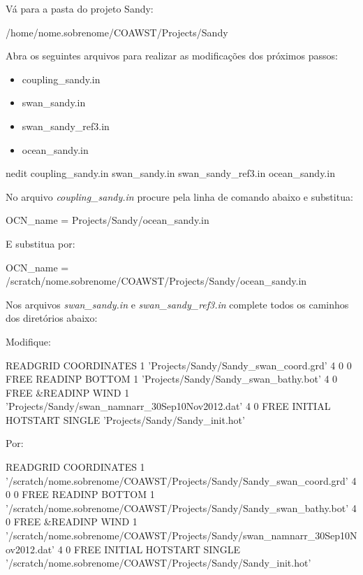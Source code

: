 \noindent Vá para a pasta do projeto Sandy:
\bigskip

\begin{bashcode}
/home/nome.sobrenome/COAWST/Projects/Sandy
\end{bashcode}
\bigskip

\noindent Abra os seguintes arquivos para realizar as modificações dos próximos passos:
\bigskip

\begin{itemize}
\item coupling\_sandy.in
\item swan\_sandy.in
\item swan\_sandy\_ref3.in
\item ocean\_sandy.in
\end{itemize}
\bigskip

\begin{bashcode}
nedit coupling_sandy.in swan_sandy.in swan_sandy_ref3.in ocean_sandy.in
\end{bashcode}
\bigskip

\noindent No arquivo \textit{coupling\_sandy.in} procure pela linha de comando abaixo e substitua:
\bigskip

\begin{bashcode}
OCN_name = Projects/Sandy/ocean_sandy.in
\end{bashcode}
\bigskip

\noindent E substitua por:
\bigskip

\begin{bashcode}
OCN_name = /scratch/nome.sobrenome/COAWST/Projects/Sandy/ocean_sandy.in
\end{bashcode}
\bigskip

\noindent Nos arquivos \textit{swan\_sandy.in} e \textit{swan\_sandy\_ref3.in} complete todos os caminhos dos diretórios abaixo:
\bigskip

\noindent Modifique:
\bigskip

\begin{bashcode}
READGRID COORDINATES 1 'Projects/Sandy/Sandy_swan_coord.grd' 4 0 0 FREE
READINP BOTTOM 1 'Projects/Sandy/Sandy_swan_bathy.bot' 4 0 FREE
&READINP WIND 1 'Projects/Sandy/swan_namnarr_30Sep10Nov2012.dat' 4 0 FREE
INITIAL HOTSTART SINGLE 'Projects/Sandy/Sandy_init.hot'
\end{bashcode}
\bigskip

\noindent Por:
\bigskip

\begin{bashcode}[fontsize=\scriptsize]
READGRID COORDINATES 1 '/scratch/nome.sobrenome/COAWST/Projects/Sandy/Sandy_swan_coord.grd' 4 0 0 FREE
READINP BOTTOM 1 '/scratch/nome.sobrenome/COAWST/Projects/Sandy/Sandy_swan_bathy.bot' 4 0 FREE
&READINP WIND 1 '/scratch/nome.sobrenome/COAWST/Projects/Sandy/swan_namnarr_30Sep10Nov2012.dat' 4 0 FREE
INITIAL HOTSTART SINGLE '/scratch/nome.sobrenome/COAWST/Projects/Sandy/Sandy_init.hot'
\end{bashcode}
\bigskip

